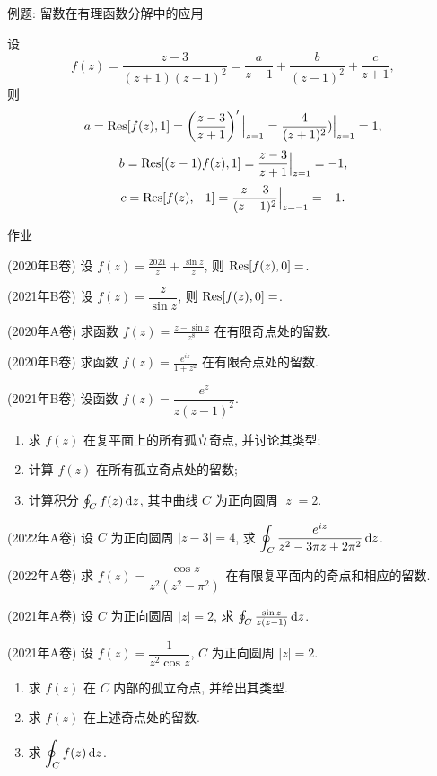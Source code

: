 \begin{frame}{例题: 留数在有理函数分解中的应用}
\onslide<+->
\begin{solution}
设
\[f(z)=\frac{z-3}{(z+1)(z-1)^2}=\frac a{z-1}+\frac b{(z-1)^2}+\frac c{z+1},\]
\onslide<+->
则
\[a={\mathrm{Res}}[f(z),1]=\left(\frac{z-3}{z+1}\right)'\Big|_{z=1}
=\frac 4{(z+1)^2})\Big|_{z=1}=1,\]
\[b={\mathrm{Res}}[(z-1)f(z),1]=\frac{z-3}{z+1}\Big|_{z=1}
=-1,\]
\[c={\mathrm{Res}}[f(z),-1]=\frac{z-3}{(z-1)^2}\Big|_{z=-1}
=-1.\]
\end{solution}
\end{frame}


{
\homework
\begin{frame}[<*>]{作业}
	\begin{homeworks}
		\item(2020年B卷) 设 $f(z)=\frac{2021}z+\frac{\sin z}z$, 则 ${\mathrm{Res}}[f(z),0]=$\fillblank{}.
		\item(2021年B卷) 设 $f(z)=\dfrac{z}{\sin z}$, 则 ${\mathrm{Res}}[f(z),0]=$\fillblank{}.
		\item(2020年A卷) 求函数 $f(z)=\frac{z-\sin z}{z^8}$ 在有限奇点处的留数.  
		\item(2020年B卷) 求函数 $f(z)=\frac{e^{iz}}{1+z^2}$ 在有限奇点处的留数.  
		\item(2021年B卷) 设函数 $f(z)=\dfrac{e^z}{z(z-1)^2}$.
		\begin{enumerate}
			\item 求 $f(z)$ 在复平面上的所有孤立奇点, 并讨论其类型;
			\item 计算 $f(z)$ 在所有孤立奇点处的留数;
			\item 计算积分 $\oint_Cf(z)\,\mathrm{d} z$, 其中曲线 $C$ 为正向圆周 $|z|=2$.
		\end{enumerate}	
		\item(2022年A卷) 设 $C$ 为正向圆周 $|z-3|=4$, 求 $\displaystyle\oint_C\frac{e^{iz}}{z^2-3\pi z+2\pi^2}\,\mathrm{d} z$.
		\item(2022年A卷) 求 $f(z)=\dfrac{\cos z}{z^2(z^2-\pi^2)}$ 在有限复平面内的奇点和相应的留数.
    \item(2021年A卷) 设 $C$ 为正向圆周 $|z|=2$, 求 $\oint_C\frac{\sin z}{z(z-1)}\,\mathrm{d} z$.
		\item(2021年A卷) 设 $f(z)=\dfrac1{z^2\cos z}$, $C$ 为正向圆周 $|z|=2$.
		\begin{enumerate}
			\item 求 $f(z)$ 在 $C$ 内部的孤立奇点, 并给出其类型.
			\item 求 $f(z)$ 在上述奇点处的留数.
			\item 求 $\displaystyle\oint_C f(z)\,\mathrm{d} z$.
		\end{enumerate}
	\end{homeworks}
\end{frame}
}

